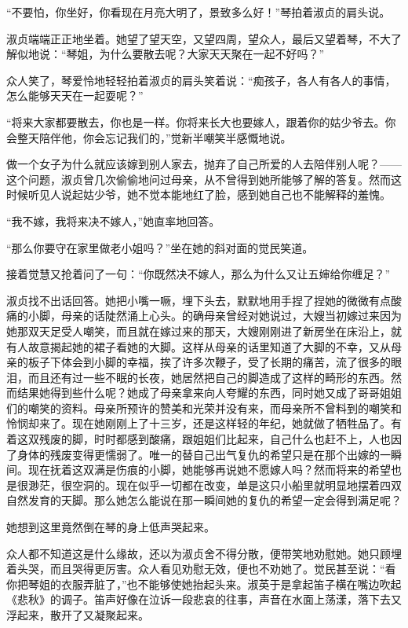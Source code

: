 \par “不要怕，你坐好，你看现在月亮大明了，景致多么好！”琴拍着淑贞的肩头说。
\par 淑贞端端正正地坐着。她望了望天空，又望四周，望众人，最后又望着琴，不大了解似地说：“琴姐，为什么要散去呢？大家天天聚在一起不好吗？”
\par 众人笑了，琴爱怜地轻轻拍着淑贞的肩头笑着说：“痴孩子，各人有各人的事情，怎么能够天天在一起耍呢？”
\par “将来大家都要散去，你也是一样。你将来长大也要嫁人，跟着你的姑少爷去。你会整天陪伴他，你会忘记我们的，”觉新半嘲笑半感慨地说。
\par 做一个女子为什么就应该嫁到别人家去，抛弃了自己所爱的人去陪伴别人呢？——这个问题，淑贞曾几次偷偷地问过母亲，从不曾得到她所能够了解的答复。然而这时候听见人说起姑少爷，她不觉本能地红了脸，感到她自己也不能解释的羞愧。
\par “我不嫁，我将来决不嫁人，”她直率地回答。
\par “那么你要守在家里做老小姐吗？”坐在她的斜对面的觉民笑道。
\par 接着觉慧又抢着问了一句：“你既然决不嫁人，那么为什么又让五婶给你缠足？”
\par 淑贞找不出话回答。她把小嘴一噘，埋下头去，默默地用手捏了捏她的微微有点酸痛的小脚，母亲的话陡然涌上心头。的确母亲曾经对她说过，大嫂当初嫁过来因为她那双天足受人嘲笑，而且就在嫁过来的那天，大嫂刚刚进了新房坐在床沿上，就有人故意揭起她的裙子看她的大脚。这样从母亲的话里知道了大脚的不幸，又从母亲的板子下体会到小脚的幸福，挨了许多次鞭子，受了长期的痛苦，流了很多的眼泪，而且还有过一些不眠的长夜，她居然把自己的脚造成了这样的畸形的东西。然而结果她得到些什么呢？她成了母亲拿来向人夸耀的东西，同时她又成了哥哥姐姐们的嘲笑的资料。母亲所预许的赞美和光荣并没有来，而母亲所不曾料到的嘲笑和怜悯却来了。现在她刚刚上了十三岁，还是这样轻的年纪，她就做了牺牲品了。有着这双残废的脚，时时都感到酸痛，跟姐姐们比起来，自己什么也赶不上，人也因了身体的残废变得更懦弱了。唯一的替自己出气复仇的希望只是在那个出嫁的一瞬间。现在抚着这双满是伤痕的小脚，她能够再说她不愿嫁人吗？然而将来的希望也是很渺茫，很空洞的。现在似乎一切都在改变，单是这只小船里就明显地摆着四双自然发育的天脚。那么她怎么能说在那一瞬间她的复仇的希望一定会得到满足呢？
\par 她想到这里竟然倒在琴的身上低声哭起来。
\par 众人都不知道这是什么缘故，还以为淑贞舍不得分散，便带笑地劝慰她。她只顾埋着头哭，而且哭得更厉害。众人看见劝慰无效，便也不劝她了。觉民甚至说：“看你把琴姐的衣服弄脏了，”也不能够使她抬起头来。淑英于是拿起笛子横在嘴边吹起《悲秋》的调子。笛声好像在泣诉一段悲哀的往事，声音在水面上荡漾，落下去又浮起来，散开了又凝聚起来。
